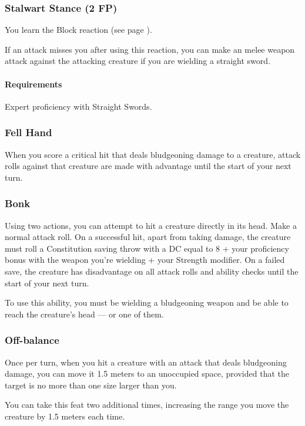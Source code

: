 \subsubsection{Stalwart Stance (2 FP)} \label{feat::stalwartstance}
    You learn the Block reaction (see page \pageref{act::block}).

    If an attack misses you after using this reaction, you can make an melee weapon attack against the attacking creature if you are wielding a straight sword.
    \paragraph{Requirements} Expert proficiency with Straight Swords.

\subsubsection{Fell Hand} \label{feat::fellhand}
    When you score a critical hit that deals bludgeoning damage to a creature, attack rolls against that creature are made with advantage until the start of your next turn.
\subsubsection{Bonk} \label{feat::bonk}
    Using two actions, you can attempt to hit a creature directly in its head.
    Make a normal attack roll.
    On a successful hit, apart from taking damage, the creature must roll a Constitution saving throw with a DC equal to 8 + your proficiency bonus with the weapon you're wielding + your Strength modifier.
    On a failed save, the creature has disadvantage on all attack rolls and ability checks until the start of your next turn.

    To use this ability, you must be wielding a bludgeoning weapon and be able to reach the creature's head --- or one of them.
\subsubsection{Off-balance} \label{feat::offbalance}
    Once per turn, when you hit a creature with an attack that deals bludgeoning damage, you can move it 1.5 meters to an unoccupied space, provided that the target is no more than one size larger than you.

    You can take this feat two additional times, increasing the range you move the creature by 1.5 meters each time.

